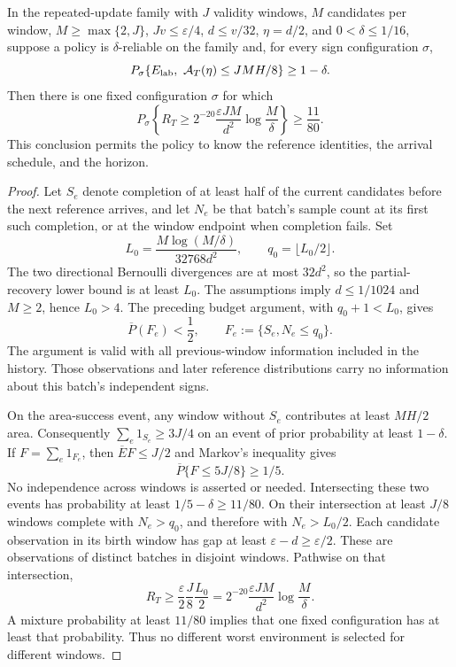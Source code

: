 \begin{theorem}
\label{thm:quantile_lower}
In the repeated-update family with $J$ validity windows, $M$ candidates per
window, $M\ge\max\{2,J\}$, $Jv\le\varepsilon/4$,
$d\le v/32$, $\eta=d/2$, and $0<\delta\le1/16$, suppose a policy is
$\delta$-reliable on the family and, for every sign configuration $\sigma$,
\[
 P_\sigma\{E_{\rm lab},\ \mathcal A_T(\eta)\le JMH/8\}\ge1-\delta.
\]
Then there is one fixed configuration $\sigma$ for which
\[
 P_\sigma\left\{R_T\ge
 2^{-20}\frac{\varepsilon JM}{d^2}\log\frac M\delta\right\}
 \ge\frac{11}{80}.
\]
This conclusion permits the policy to know the reference identities, the
arrival schedule, and the horizon.
\end{theorem}
\begin{proof}
Let $S_e$ denote completion of at least half of the current candidates before
the next reference arrives, and let $N_e$ be that batch's sample count at its
first such completion, or at the window endpoint when completion fails.
Set
\[
 L_0=\frac{M\log(M/\delta)}{32768d^2},\qquad
 q_0=\lfloor L_0/2\rfloor.
\]
The two directional Bernoulli divergences are at most $32d^2$, so the
partial-recovery lower bound is at least $L_0$. The assumptions imply
$d\le1/1024$ and $M\ge2$, hence $L_0>4$.
The preceding budget argument, with $q_0+1<L_0$, gives
\[
 \overline P(F_e)<\frac12,
 \qquad F_e:=\{S_e,N_e\le q_0\}.
\]
The argument is valid with all previous-window information included in the
history. Those observations and later reference distributions carry no
information about this batch's independent signs.

On the area-success event, any window without $S_e$ contributes at least
$MH/2$ area. Consequently $\sum_e1_{S_e}\ge3J/4$ on an event of prior
probability at least $1-\delta$. If $F=\sum_e1_{F_e}$, then
$\overline EF\le J/2$ and Markov's inequality gives
\[
 \overline P\{F\le5J/8\}\ge1/5.
\]
No independence across windows is asserted or needed. Intersecting these two
events has probability at least
$1/5-\delta\ge11/80$. On their intersection at least $J/8$ windows complete
with $N_e>q_0$, and therefore with $N_e>L_0/2$.
Each candidate observation in its birth window has gap at least
$\varepsilon-d\ge\varepsilon/2$. These are observations of distinct batches
in disjoint windows. Pathwise on that intersection,
\[
 R_T\ge\frac{\varepsilon}{2}\frac J8\frac{L_0}{2}
 =2^{-20}\frac{\varepsilon JM}{d^2}\log\frac M\delta.
\]
A mixture probability at least $11/80$ implies that one fixed configuration
has at least that probability. Thus no different worst environment is selected
for different windows.
\end{proof}

